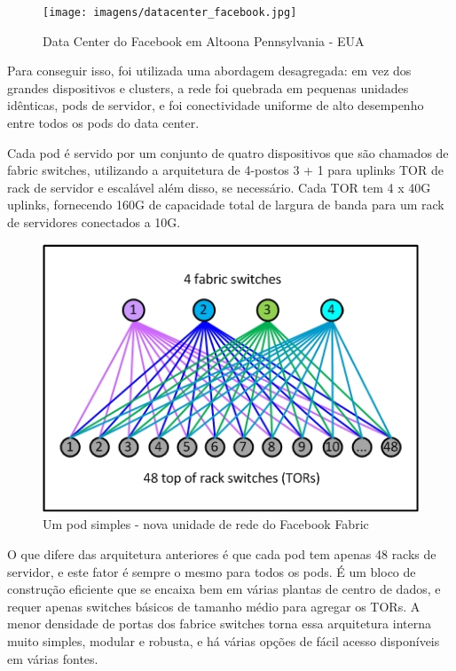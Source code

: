 \documentclass[12pt,a4paper]{report}
\begin{document}
\begin{figure}[H]
\centering
\texttt{[image: imagens/datacenter\_facebook.jpg]}
\caption{Data Center do Facebook em Altoona Pennsylvania - EUA}
\label{dc_container}
\end{figure}

Para conseguir isso, foi utilizada uma abordagem desagregada: 
em vez dos grandes dispositivos e clusters, 
a rede foi quebrada em pequenas unidades idênticas, 
pods de servidor, e foi conectividade uniforme de alto desempenho entre todos os pods do data center.


Cada pod é servido por um conjunto de quatro dispositivos que são chamados de fabric switches, utilizando a arquitetura de 4-postos 3 + 1 para 
uplinks TOR de rack de servidor e escalável além disso, se necessário. Cada TOR tem  4 x 40G uplinks, 
fornecendo 160G de capacidade total de largura de banda para um rack de servidores conectados a 10G.

\begin{figure}[H]
\centering
\includegraphics[width=.7\textwidth]{imagens/pod.jpg}
\caption{Um pod simples - nova unidade de rede do Facebook Fabric}
\label{dc_container}
\end{figure}


O que difere das arquitetura anteriores é que cada pod tem apenas 48 racks de servidor, 
e este fator é sempre o mesmo para todos os pods. 
É um bloco de construção eficiente que se encaixa bem em várias plantas de centro de dados,
e requer apenas switches básicos de tamanho médio para agregar os TORs. 
A menor densidade de portas dos fabrice switches torna essa arquitetura interna muito simples, 
modular e robusta, e há várias opções de fácil acesso disponíveis em várias fontes.
\end{document}
